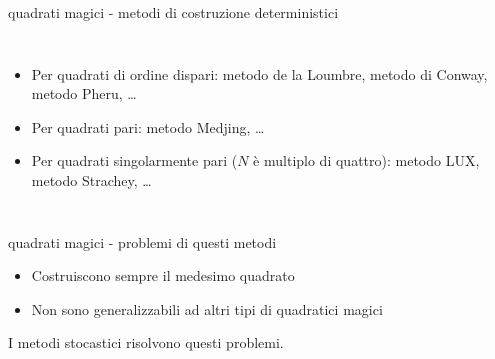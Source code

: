 \documentclass[10pt]{beamer}
\begin{document}
\begin{frame}{quadrati magici - metodi di costruzione deterministici}

	\begin{columns}[T,onlytextwidth]


	\begin{itemize}
		\item Per quadrati di ordine dispari: metodo de la Loumbre, metodo di Conway, metodo Pheru, \dots
		\item Per quadrati pari: metodo Medjing, \dots
		\item Per quadrati singolarmente pari ($ N $ è multiplo di quattro): metodo LUX, metodo Strachey, \dots
	\end{itemize}




	\end{columns}

\end{frame}

\begin{frame}{quadrati magici - problemi di questi metodi}
  \begin{itemize}
  	\item Costruiscono sempre il medesimo quadrato
  	\item Non sono generalizzabili ad altri tipi di quadratici magici
  \end{itemize}
  \centering
  I metodi stocastici risolvono questi problemi.
\end{frame}

\end{document}
